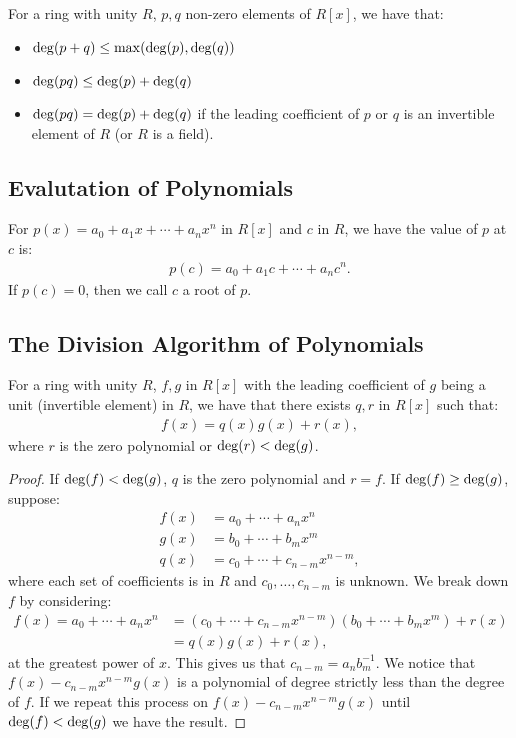 For a ring with unity $R$, $p, q$ non-zero elements of $R[x]$, we have that: 
\begin{itemize}
  \item $\operatorname{deg}(p + q) \leq \operatorname{max}(\operatorname{deg}(p), \operatorname{deg}(q))$ 
  \item $\operatorname{deg}(pq) \leq \operatorname{deg}(p) + \operatorname{deg}(q)$ 
  \item $\operatorname{deg}(pq) = \operatorname{deg}(p) + \operatorname{deg}(q)$ if the leading coefficient of
  $p$ or $q$ is an invertible element of $R$ (or $R$ is a field).
\end{itemize}

\subsection{Evalutation of Polynomials}

For $p(x) = a_0 + a_1x + \cdots + a_nx^n$ in $R[x]$ and $c$ in $R$, we have
the value of $p$ at $c$ is: \begin{gather*}
  p(c) = a_0 + a_1c + \cdots + a_nc^n.
\end{gather*} If $p(c) = 0$, then we call $c$ a root of $p$.

\subsection{The Division Algorithm of Polynomials} \label{polydiv}

For a ring with unity $R$, $f, g$ in $R[x]$ with the leading coefficient of $g$ being a unit 
(invertible element) in $R$, we have that there exists $q, r$ in $R[x]$ such that: \begin{gather*}
  f(x) = q(x)g(x) + r(x),
\end{gather*} where $r$ is the zero polynomial or $\operatorname{deg}(r) < \operatorname{deg}(g)$.
\begin{proof}
    If $\operatorname{deg}(f) < \operatorname{deg}(g)$, $q$ is the zero polynomial and $r = f$.
    If $\operatorname{deg}(f) \geq \operatorname{deg}(g)$, suppose: \begin{align*}
        f(x) &= a_0 + \cdots + a_n x^n \\
        g(x) &= b_0 + \cdots + b_m x^m \\
        q(x) &= c_0 + \cdots + c_{n - m} x^{n - m},
    \end{align*} where each set of coefficients is in $R$ and $c_0, \ldots, c_{n - m}$
    is unknown. We break down $f$ by considering: \begin{align*}
        f(x) = a_0 + \cdots + a_n x^n &= (c_0 + \cdots + c_{n - m} x^{n - m})
        (b_0 + \cdots + b_m x^m) + r(x) \\
        &= q(x)g(x) + r(x),
    \end{align*} at the greatest power of $x$. This gives us that 
    $c_{n - m} = a_n b_m^{-1}$. We notice that $f(x) - c_{n - m}x^{n - m}g(x)$
    is a polynomial of degree strictly less than the degree of $f$. If we
    repeat this process on  $f(x) - c_{n - m}x^{n - m}g(x)$ until 
    $\operatorname{deg}(f) < \operatorname{deg}(g)$ we have the result.
\end{proof}

